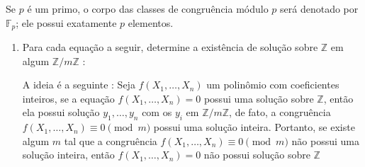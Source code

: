 Se $p$ é um primo, o corpo das classes de congruência módulo $p$ será denotado por $\mathbb{F}_p$; ele possui 
exatamente $p$ elementos.

\begin{exemplo}
    \leavevmode
    \begin{enumerate}[left=0.5cm, align=left, nosep]
        \item Para cada equação a seguir, determine a existência de solução sobre $\mathbb{Z}$ em algum
        $\mathbb{Z}/m\mathbb{Z}$ : 
        
        A ideia é a seguinte : Seja $f(X_1,\ldots,X_n)$ um polinômio com coeficientes inteiros, se a equação
        $f(X_1,\ldots,X_n) = 0$ possui uma solução sobre $\mathbb{Z}$, então ela possui solução $y_1,\ldots,y_n$ com os $y_i$
        em $\mathbb{Z}/m\mathbb{Z}$, de fato, a congruência $f(X_1,\ldots,X_n) \equiv 0 \pmod m$ possui uma solução inteira.
        Portanto, se existe algum $m$ tal que a congruência $f(X_1,\ldots,X_n) \equiv 0 \pmod m$ não possui uma solução inteira,
        então $f(X_1,\ldots,X_n) = 0$ não possui solução sobre $\mathbb{Z}$


\end{enumerate}
\end{exemplo}
